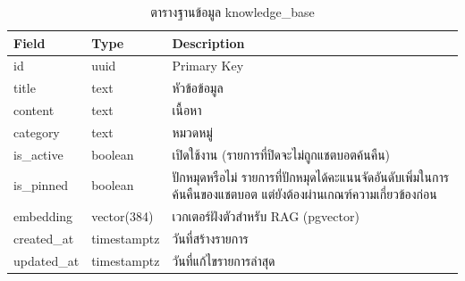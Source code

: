 \begin{table}[H]
\centering
\caption{ตารางฐานข้อมูล knowledge\_base}
\label{tab:db_kb}
\begin{tabular}{|p{3.6cm}|p{2.6cm}|p{6.8cm}|}
\hline
\textbf{Field} & \textbf{Type} & \textbf{Description} \\
\hline
id & uuid & Primary Key \\ \hline
title & text & หัวข้อข้อมูล \\ \hline
content & text & เนื้อหา \\ \hline
category & text & หมวดหมู่ \\ \hline
is\_active & boolean & เปิดใช้งาน (รายการที่ปิดจะไม่ถูกแชตบอตค้นคืน) \\ \hline
is\_pinned & boolean & ปักหมุดหรือไม่ รายการที่ปักหมุดได้คะแนนจัดอันดับเพิ่มในการค้นคืนของแชตบอต แต่ยังต้องผ่านเกณฑ์ความเกี่ยวข้องก่อน \\ \hline
embedding & vector(384) & เวกเตอร์ฝังตัวสำหรับ RAG (pgvector) \\ \hline
created\_at & timestamptz & วันที่สร้างรายการ \\ \hline
updated\_at & timestamptz & วันที่แก้ไขรายการล่าสุด \\
\hline
\end{tabular}
\end{table}


